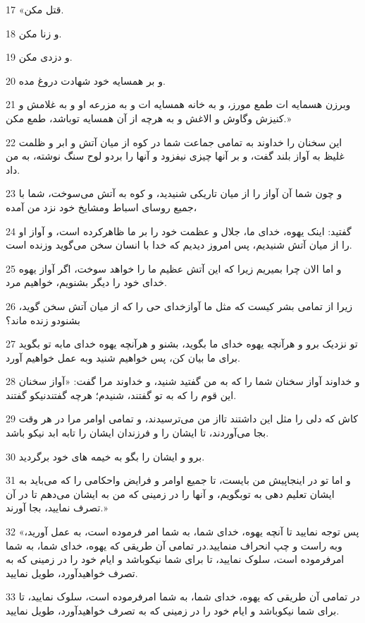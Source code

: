 \par 17 «قتل مکن.
\par 18 و زنا مکن.
\par 19 و دزدی مکن.
\par 20 و بر همسایه خود شهادت دروغ مده.
\par 21 وبرزن هسمایه ات طمع مورز، و به خانه همسایه ات و به مزرعه او و به غلامش و کنیزش وگاوش و الاغش و به هرچه از آن همسایه توباشد، طمع مکن.»
\par 22 این سخنان را خداوند به تمامی جماعت شما در کوه از میان آتش و ابر و ظلمت غلیظ به آواز بلند گفت، و بر آنها چیزی نیفزود و آنها را بردو لوح سنگ نوشته، به من داد.
\par 23 و چون شما آن آواز را از میان تاریکی شنیدید، و کوه به آتش می‌سوخت، شما با جمیع روسای اسباط ومشایخ خود نزد من آمده،
\par 24 گفتید: اینک یهوه، خدای ما، جلال و عظمت خود را بر ما ظاهرکرده است، و آواز او را از میان آتش شنیدیم، پس امروز دیدیم که خدا با انسان سخن می‌گوید وزنده است.
\par 25 و اما الان چرا بمیریم زیرا که این آتش عظیم ما را خواهد سوخت، اگر آواز یهوه خدای خود را دیگر بشنویم، خواهیم مرد.
\par 26 زیرا از تمامی بشر کیست که مثل ما آوازخدای حی را که از میان آتش سخن گوید، بشنودو زنده ماند؟
\par 27 تو نزدیک برو و هرآنچه یهوه خدای ما بگوید، بشنو و هرآنچه یهوه خدای مابه تو بگوید برای ما بیان کن، پس خواهیم شنید وبه عمل خواهیم آورد.
\par 28 و خداوند آواز سخنان شما را که به من گفتید شنید، و خداوند مرا گفت: «آواز سخنان این قوم را که به تو گفتند، شنیدم؛ هرچه گفتندنیکو گفتند.
\par 29 کاش که دلی را مثل این داشتند تااز من می‌ترسیدند، و تمامی اوامر مرا در هر وقت بجا می‌آوردند، تا ایشان را و فرزندان ایشان را تابه ابد نیکو باشد.
\par 30 برو و ایشان را بگو به خیمه های خود برگردید.
\par 31 و اما تو در اینجاپیش من بایست، تا جمیع اوامر و فرایض واحکامی را که می‌باید به ایشان تعلیم دهی به توبگویم، و آنها را در زمینی که من به ایشان می‌دهم تا در آن تصرف نمایید، بجا آورند.»
\par 32 «پس توجه نمایید تا آنچه یهوه، خدای شما، به شما امر فرموده است، به عمل آورید، وبه راست و چپ انحراف منمایید.در تمامی آن طریقی که یهوه، خدای شما، به شما امرفرموده است، سلوک نمایید، تا برای شما نیکوباشد و ایام خود را در زمینی که به تصرف خواهیدآورد، طویل نمایید.
\par 33 در تمامی آن طریقی که یهوه، خدای شما، به شما امرفرموده است، سلوک نمایید، تا برای شما نیکوباشد و ایام خود را در زمینی که به تصرف خواهیدآورد، طویل نمایید.
 
